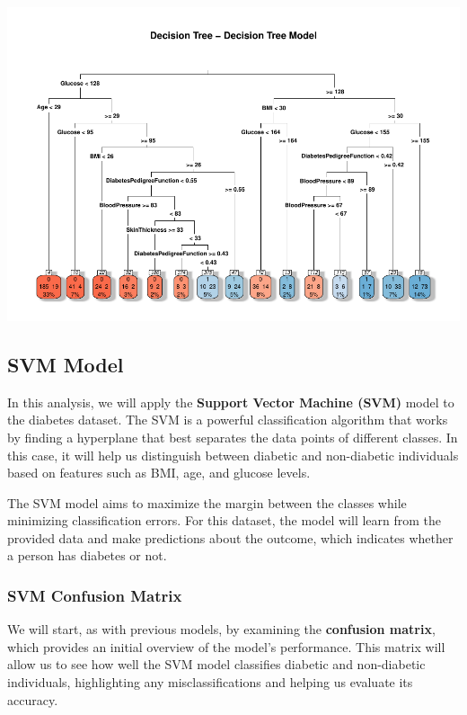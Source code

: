 \documentclass[
]{article}
\begin{document}
\begin{center}\includegraphics{Diabetes-Project_files/figure-latex/deciison tree plot-1} \end{center}

\subsection{SVM Model}\label{svm-model}

In this analysis, we will apply the \textbf{Support Vector Machine
(SVM)} model to the diabetes dataset. The SVM is a powerful
classification algorithm that works by finding a hyperplane that best
separates the data points of different classes. In this case, it will
help us distinguish between diabetic and non-diabetic individuals based
on features such as BMI, age, and glucose levels.

The SVM model aims to maximize the margin between the classes while
minimizing classification errors. For this dataset, the model will learn
from the provided data and make predictions about the outcome, which
indicates whether a person has diabetes or not.

\subsubsection{SVM Confusion Matrix}\label{svm-confusion-matrix}

We will start, as with previous models, by examining the
\textbf{confusion matrix}, which provides an initial overview of the
model's performance. This matrix will allow us to see how well the SVM
model classifies diabetic and non-diabetic individuals, highlighting any
misclassifications and helping us evaluate its accuracy.
\end{document}
